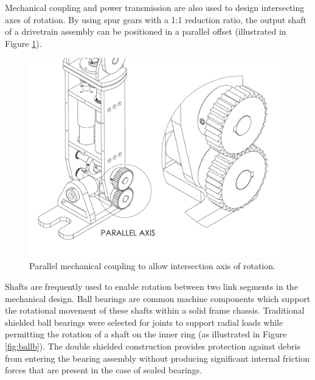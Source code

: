 Mechanical coupling and power transmission are also used to design  intersecting axes of rotation. By using spur gears with a 1:1 reduction ratio, the output shaft of a drivetrain assembly can be positioned in a parallel offset (illustrated in Figure \ref{fig:spur}).

\begin{figure}[!h]	
	\begin{center}
    \includegraphics[scale=0.5]{fig/design/parallel.pdf}
	\end{center}
  \caption{Parallel mechanical coupling to allow intersection axis of rotation.}
\label{fig:spur}
\end{figure}

Shafts are frequently used to enable rotation between two link segments in the mechanical design. Ball bearings are common machine components which support the rotational movement of these shafts within a solid frame chassis. Traditional shielded ball bearings were selected for joints to support radial loads while permitting the rotation of a shaft on the inner ring (as illustrated in Figure \ref{fig:ballb}). The double shielded construction provides protection against debris from entering the bearing assembly without producing significant internal friction forces that are present in the case of sealed bearings. 

